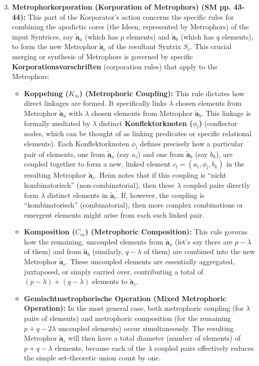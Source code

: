 \documentclass[12pt]{article}
\newcommand{\q}[1]{\enquote{#1}}
\newcommand{\metrophor}{\bm{\widetilde{a}}}
\begin{document}
\begin{itemize}
    \begin{enumerate}
        \setcounter{enumii}{2} %
        \item \textbf{Metrophorkorporation (Korporation of Metrophors) (SM pp. 43-44):} This part of the Korporator's action concerns the specific rules for combining the apodictic cores (the Ideen, represented by Metrophors) of the input Syntrices, say \( \metrophor_a \) (which has \( p \) elements) and \( \metrophor_b \) (which has \( q \) elements), to form the new Metrophor \( \metrophor_c \) of the resultant Syntrix \( S_c \). This crucial merging or synthesis of Metrophors is governed by specific \textbf{Korporationsvorschriften} (corporation rules) that apply to the Metrophors:
        \begin{itemize}
            \item \textbf{Koppelung (\( K_m \)) (Metrophoric Coupling):} This rule dictates how direct linkages are formed. It specifically links \( \lambda \) chosen elements from Metrophor \( \metrophor_a \) with \( \lambda \) chosen elements from Metrophor \( \metrophor_b \). This linkage is formally mediated by \( \lambda \) distinct \textbf{Konflektorknoten (\( \phi_l \))} (conflector nodes, which can be thought of as linking predicates or specific relational elements). Each Konflektorknoten \( \phi_l \) defines precisely how a particular pair of elements, one from \( \metrophor_a \) (say \( a_i \)) and one from \( \metrophor_b \) (say \( b_k \)), are coupled together to form a new, linked element \( c_l = (a_i, \phi_l, b_k) \) in the resulting Metrophor \( \metrophor_c \). Heim notes that if this coupling is \q{nicht kombinatorisch} (non-combinatorial), then these \( \lambda \) coupled pairs directly form \( \lambda \) distinct elements in \( \metrophor_c \). If, however, the coupling is \q{kombinatorisch} (combinatorial), then more complex combinations or emergent elements might arise from each such linked pair.
            \item \textbf{Komposition (\( C_m \)) (Metrophoric Composition):} This rule governs how the remaining, uncoupled elements from \( \metrophor_a \) (let's say there are \( p-\lambda \) of them) and from \( \metrophor_b \) (similarly, \( q-\lambda \) of them) are combined into the new Metrophor \( \metrophor_c \). These uncoupled elements are essentially aggregated, juxtaposed, or simply carried over, contributing a total of \( (p-\lambda) + (q-\lambda) \) elements to \( \metrophor_c \).
            \item \textbf{Gemischtmetrophorische Operation (Mixed Metrophoric Operation):} In the most general case, both metrophoric coupling (for \( \lambda \) pairs of elements) and metrophoric composition (for the remaining \( p+q-2\lambda \) uncoupled elements) occur simultaneously. The resulting Metrophor \( \metrophor_c \) will then have a total diameter (number of elements) of \( p+q-\lambda \) elements, because each of the \(\lambda\) coupled pairs effectively reduces the simple set-theoretic union count by one.

\end{itemize}
\end{enumerate}
\end{itemize}
\end{document}
